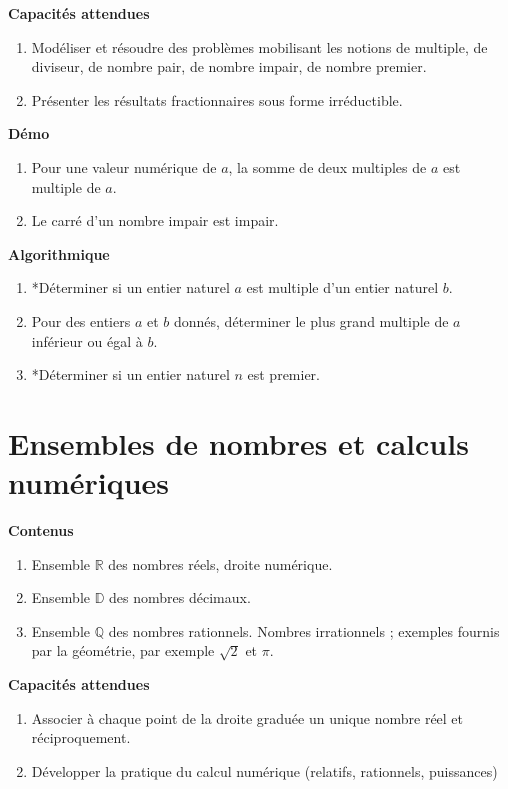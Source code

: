 \documentclass[10pt,a4paper]{article}
\begin{document}
\textbf{Capacités attendues}

\begin{enumerate}
\item Modéliser et résoudre des problèmes mobilisant les notions de multiple, de diviseur, 
de nombre pair, de nombre impair, de nombre premier.
\item Présenter les résultats fractionnaires sous forme irréductible.
\end{enumerate}

\textbf{Démo}

\begin{enumerate}
\item  Pour une valeur numérique de $a$, la somme de deux multiples de $a$ est multiple de $a$.
\item  Le carré d'un nombre impair est impair.
\end{enumerate}

\textbf{Algorithmique}

\begin{enumerate}
\item *Déterminer si un entier naturel $a$ est multiple d'un entier naturel $b$.
\item Pour des entiers $a$ et $b$ donnés, déterminer le plus grand multiple de $a$ inférieur ou égal à $b$.
\item *Déterminer si un entier naturel $n$ est premier.
 \end{enumerate}

\section{Ensembles de nombres et calculs numériques}
\textbf{Contenus}

\begin{enumerate}
\item Ensemble $\mathbb{R}$ des nombres réels, droite numérique.
\item Ensemble $\mathbb{D}$ des nombres décimaux. 
\item Ensemble $\mathbb{Q}$ des nombres rationnels. Nombres irrationnels ; exemples fournis par la géométrie, par exemple $\sqrt 2$ et $\pi$.
\end{enumerate}

\textbf{Capacités attendues}

\begin{enumerate}
\item Associer à chaque point de la droite graduée un unique nombre réel et 
réciproquement.
\item Développer la pratique du calcul numérique (relatifs, rationnels, puissances)
\end{enumerate}
\end{document}
